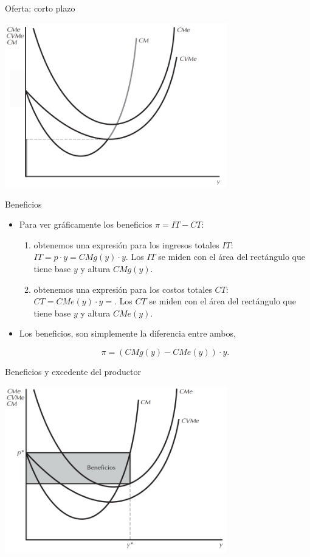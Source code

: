 \documentclass{beamer}
\theoremstyle{definition}
\begin{document}
\begin{frame}{Oferta: corto plazo}
\begin{center}
\includegraphics[width=3.8in]{figures4/oferta.png}
\end{center}
\end{frame}

\begin{frame}{Beneficios}
\begin{itemize}
\item Para ver gráficamente los beneficios $\pi=IT-CT$:

\begin{enumerate}
    \item obtenemos una expresión para los ingresos totales $IT$: $IT=p\cdot y=CMg(y)\cdot y$. Los $IT$ se miden con el \'area del rectángulo que tiene base $y$ y altura $CMg(y)$.
    \item obtenemos una expresión para los costos totales $CT$: $CT=CMe(y)\cdot y=$. Los $CT$ se miden con el \'area del rectángulo que tiene base $y$ y altura $CMe(y)$.
\end{enumerate} 
\item Los beneficios, son simplemente la diferencia entre ambos, 

\[\pi =(CMg(y)-CMe(y))\cdot y.\]
\end{itemize}
\end{frame}

\begin{frame}{Beneficios y excedente del productor}
\begin{center}
\includegraphics[width=3.8in]{figures4/beneficios.png}
\end{center}
\end{frame}
\end{document}
